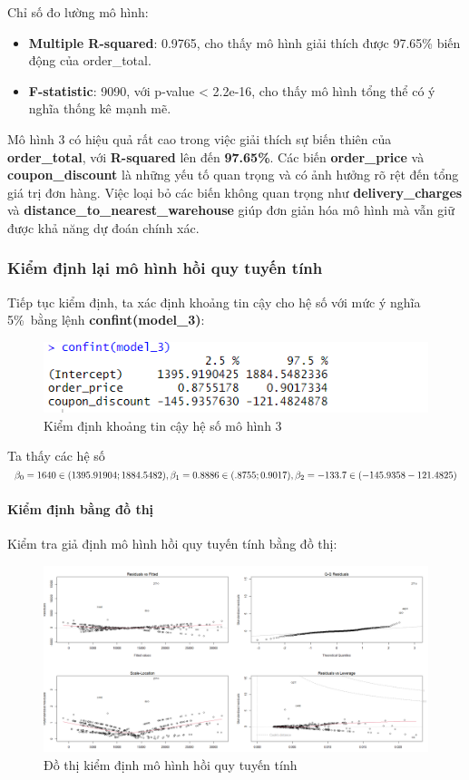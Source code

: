 Chỉ số đo lường mô hình:

\begin{itemize}
\item\textbf{Multiple R-squared}: 0.9765, cho thấy mô hình giải thích được 97.65\% biến động của order\_total.
\item\textbf{F-statistic}: 9090, với p-value < 2.2e-16, cho thấy mô hình tổng thể có ý nghĩa thống kê mạnh mẽ.
\end{itemize}

Mô hình 3 có hiệu quả rất cao trong việc giải thích sự biến thiên của \textbf{order\_total}, với \textbf{R-squared} lên đến \textbf{97.65\%}. Các biến \textbf{order\_price} và \textbf{coupon\_discount} là những yếu tố quan trọng và có ảnh hưởng rõ rệt đến tổng giá trị đơn hàng. Việc loại bỏ các biến không quan trọng như \textbf{delivery\_charges} và \textbf{distance\_to\_nearest\_warehouse} giúp đơn giản hóa mô hình mà vẫn giữ được khả năng dự đoán chính xác.

\subsubsection{Kiểm định lại mô hình hồi quy tuyến tính}
Tiếp tục kiểm định, ta xác định khoảng tin cậy cho hệ số với mức ý nghĩa 5\%\ bằng lệnh \textbf{confint(model\_3)}:
\begin{figure}[!htp]
  \centering
  \includegraphics[width=0.7\linewidth]{graphics/5.5.5.png}
  \caption{Kiểm định khoảng tin cậy hệ số mô hình 3 }
\end{figure}

Ta thấy các hệ số $\beta_0= 1640\in(1395.91904; 1884.5482), \beta_1= 0.8886\in(.8755;0.9017),\\ \beta_2= -133.7\in(-145.9358 -121.4825)$
\paragraph{Kiểm định bằng đồ thị}

Kiểm tra giả định mô hình hồi quy tuyến tính bằng đồ thị:
\newpage

\begin{figure}[!htp]
  \centering
  \includegraphics[width=0.7\linewidth]{graphics/5.5.6.png}
  \caption{Đồ thị kiểm định mô hình hồi quy  tuyến tính }
\end{figure}

